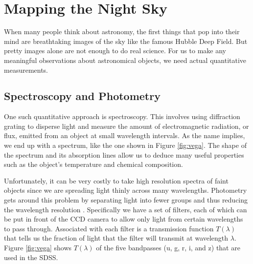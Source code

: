 
\chapter{Mapping the Night Sky}
\label{cha:astro}
When many people think about astronomy, the first things that pop into their mind are
breathtaking images of the sky like the famous Hubble Deep Field. But pretty images alone
are not enough to do real science. For us to make any meaningful observations about
astronomical objects, we need actual quantitative measurements.

\section{Spectroscopy and Photometry}
\label{sec:spec}

One such quantitative approach is spectroscopy. This involves
using diffraction grating to disperse light and measure the amount of electromagnetic radiation,
or flux, emitted from an object at small wavelength intervals. As the name implies, we end
up with a spectrum, like the one shown in Figure \ref{fig:vega}. The shape of the spectrum
and its absorption lines allow us to deduce many useful properties such as the object's
temperature and chemical composition.

Unfortunately, it can be very costly to take high resolution spectra of faint objects since
we are spreading light thinly across many wavelengths. Photometry gets around this problem
by separating light into fewer groups and thus reducing the wavelength resolution
\cite{romanishin02}. Specifically we have a set of filters, each of which can be put in
front of the CCD
camera to allow only light from certain wavelengths to pass through. Associated with
each filter is a transmission function $T(\lambda)$ that tells us
the fraction of light that the filter will transmit at wavelength $\lambda$.
Figure \ref{fig:vega} shows $T(\lambda)$ of the five bandpasses (u, g, r, i, and z) that
are used in the SDSS.

